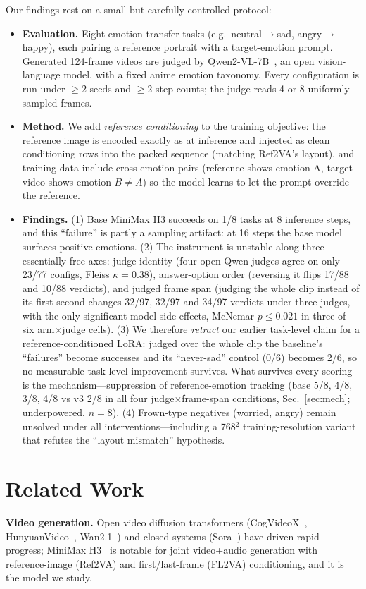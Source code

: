 \documentclass[10pt,twocolumn]{article}
\begin{document}
Our findings rest on a small but carefully controlled protocol:
\begin{itemize}
\item \textbf{Evaluation.} Eight emotion-transfer tasks (e.g.\ neutral$\rightarrow$sad,
angry$\rightarrow$happy), each pairing a reference portrait with a target-emotion prompt.
Generated 124-frame videos are judged by Qwen2-VL-7B~\cite{qwen2vl2024}, an open vision-language
model, with a fixed anime emotion taxonomy. Every configuration is run under $\ge$2 seeds and
$\ge$2 step counts; the judge reads 4 or 8 uniformly sampled frames.
\item \textbf{Method.} We add \emph{reference conditioning} to the training objective: the
reference image is encoded exactly as at inference and injected as clean conditioning rows into
the packed sequence (matching Ref2VA's layout), and training data include cross-emotion pairs
(reference shows emotion A, target video shows emotion $B\neq A$) so the model learns to let the
prompt override the reference.
\item \textbf{Findings.} (1) Base MiniMax H3 succeeds on 1/8 tasks at 8 inference steps, and this
``failure'' is partly a sampling artifact: at 16 steps the base model surfaces positive emotions.
(2) The instrument is unstable along three essentially free axes: judge identity (four open Qwen
judges agree on only 23/77 configs, Fleiss $\kappa{=}0.38$), answer-option order (reversing it flips
17/88 and 10/88 verdicts), and judged frame span (judging the whole clip instead of its first second
changes 32/97, 32/97 and 34/97 verdicts under three judges, with the only significant model-side
effects, McNemar $p{\le}0.021$ in three of six arm$\times$judge cells).
(3) We therefore \emph{retract} our earlier task-level claim for a reference-conditioned LoRA: judged
over the whole clip the baseline's ``failures'' become successes and its ``never-sad'' control (0/6)
becomes 2/6, so no measurable task-level improvement survives. What survives every scoring is the
mechanism---suppression of reference-emotion tracking (base 5/8, 4/8, 3/8, 4/8 vs v3 2/8 in all four
judge$\times$frame-span conditions, Sec.~\ref{sec:mech}; underpowered, $n{=}8$). (4) Frown-type
negatives (worried, angry) remain unsolved under all interventions---including a 768$^2$
training-resolution variant that refutes the ``layout mismatch'' hypothesis.
\end{itemize}

\section{Related Work}
\textbf{Video generation.} Open video diffusion transformers (CogVideoX~\cite{cogvideox2024},
HunyuanVideo~\cite{hunyuan2024}, Wan2.1~\cite{wan2025}) and closed systems
(Sora~\cite{sora2024}) have driven rapid progress; MiniMax H3~\cite{minimax2025} is notable for
joint video+audio generation with reference-image (Ref2VA) and first/last-frame (FL2VA)
conditioning, and it is the model we study.
\end{document}
